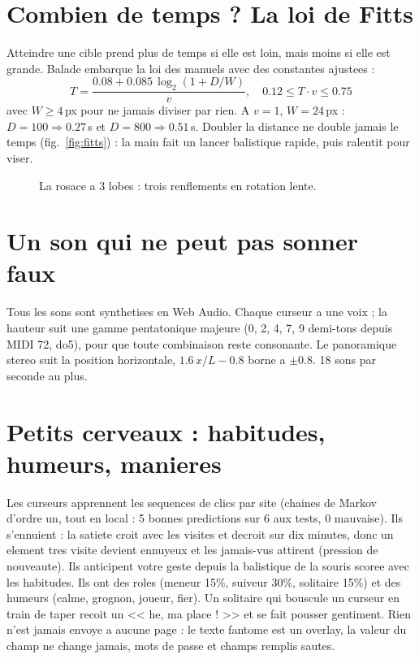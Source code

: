 \documentclass[10pt,conference]{IEEEtran}
\begin{document}
\section{Combien de temps ? La loi de Fitts}
Atteindre une cible prend plus de temps si elle est loin, mais moins si elle
est grande. Balade embarque la loi des manuels avec des constantes ajustees :
\begin{equation}
T = \frac{0.08 + 0.085\,\log_2(1 + D/W)}{v}, \quad 0.12 \le T\cdot v \le 0.75
\end{equation}
avec $W \ge 4$\,px pour ne jamais diviser par rien. A $v=1$, $W=24$\,px :
$D=100 \Rightarrow 0.27$\,s et $D=800 \Rightarrow 0.51$\,s. Doubler la
distance ne double jamais le temps (fig.~\ref{fig:fitts}) : la main fait un
lancer balistique rapide, puis ralentit pour viser.

\begin{figure}[h]
\centering
{}
\caption{La rosace a 3 lobes : trois renflements en rotation lente.}
\label{fig:rosace}
\end{figure}

\section{Un son qui ne peut pas sonner faux}
Tous les sons sont synthetises en Web Audio. Chaque curseur a une voix ; la
hauteur suit une gamme pentatonique majeure (0, 2, 4, 7, 9 demi-tons depuis
MIDI 72, do5), pour que toute combinaison reste consonante. Le panoramique
stereo suit la position horizontale, $1.6\,x/L - 0.8$ borne a $\pm0.8$. 18 sons
par seconde au plus.

\section{Petits cerveaux : habitudes, humeurs, manieres}
Les curseurs apprennent les sequences de clics par site (chaines de Markov
d'ordre un, tout en local : 5 bonnes predictions sur 6 aux tests, 0 mauvaise).
Ils s'ennuient : la satiete croit avec les visites et decroit sur dix minutes,
donc un element tres visite devient ennuyeux et les jamais-vus attirent
(pression de nouveaute). Ils anticipent votre geste depuis la balistique de
la souris scoree avec les habitudes. Ils ont des roles (meneur 15\%, suiveur
30\%, solitaire 15\%) et des humeurs (calme, grognon, joueur, fier). Un
solitaire qui bouscule un curseur en train de taper recoit un << he, ma
place ! >> et se fait pousser gentiment. Rien n'est jamais envoye a aucune
page : le texte fantome est un overlay, la valeur du champ ne change jamais,
mots de passe et champs remplis sautes.
\end{document}
